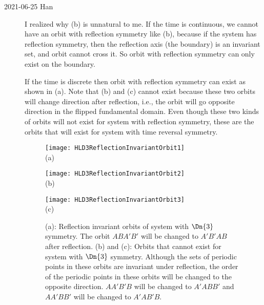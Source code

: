 \begin{description}
    \item[2021-06-25 Han]
I realized why  (b) is unnatural to me. If the time is continuous,
we cannot have an orbit with reflection symmetry like  (b), because
if the system has reflection symmetry, then the reflection axis (the boundary) is an
invariant set, and orbit cannot cross it. So orbit with reflection symmetry can only
exist on the boundary.

If the time is discrete then orbit with reflection symmetry can exist as shown in
 (a). Note that
 (b) and (c) cannot exist because these
two orbits will change direction after reflection, i.e., the orbit will go opposite direction
in the flipped fundamental domain. Even though these two kinds of orbits
will not exist for system with reflection symmetry, these are the orbits that will
exist for system with time reversal symmetry.

\begin{figure}\begin{center}
            \begin{minipage}[c]{0.3\textwidth}\begin{center}
\texttt{[image: HLD3ReflectionInvariantOrbit1]}\\(a)
            \end{center}\end{minipage}
            \begin{minipage}[c]{0.3\textwidth}\begin{center}
\texttt{[image: HLD3ReflectionInvariantOrbit2]}\\(b)
            \end{center}\end{minipage}
            \begin{minipage}[c]{0.3\textwidth}\begin{center}
\texttt{[image: HLD3ReflectionInvariantOrbit3]}\\(c)
            \end{center}\end{minipage}
\end{center}
  \caption{\label{fig:HLD3ReflectionInvariantOrbit}
(a):
Reflection invariant orbits of system with $\Dn{3}$ symmetry. The
orbit $ABA'B'$ will be changed to $A'B'AB$ after reflection.
(b) and (c):
Orbits that cannot exist for system with $\Dn{3}$ symmetry. Although
the sets of periodic points in these orbits are invariant under reflection,
the order of the periodic points in these orbits will be changed to
the opposite direction.
$AA'B'B$ will be changed to $A'ABB'$ and $AA'BB'$ will be
changed to $A'AB'B$.
}
\end{figure}


\end{description}
